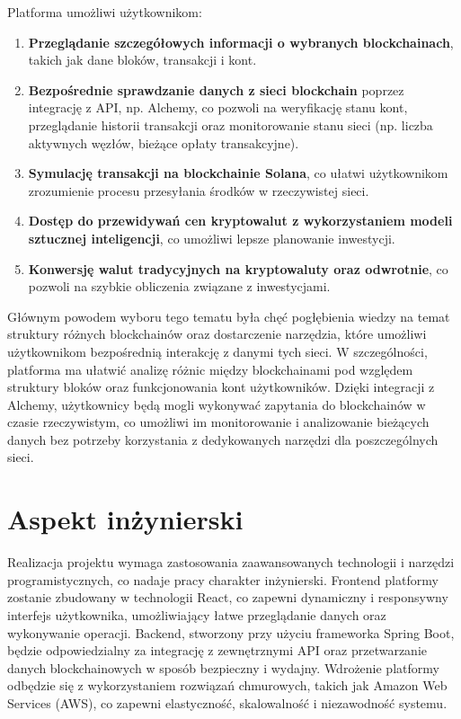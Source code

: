 Platforma umożliwi użytkownikom:

\begin{enumerate} \item \textbf{Przeglądanie szczegółowych informacji o wybranych blockchainach}, takich jak dane bloków, transakcji i kont. \item \textbf{Bezpośrednie sprawdzanie danych z sieci blockchain} poprzez integrację z API, np. Alchemy, co pozwoli na weryfikację stanu kont, przeglądanie historii transakcji oraz monitorowanie stanu sieci (np. liczba aktywnych węzłów, bieżące opłaty transakcyjne). \item \textbf{Symulację transakcji na blockchainie Solana}, co ułatwi użytkownikom zrozumienie procesu przesyłania środków w rzeczywistej sieci. \item \textbf{Dostęp do przewidywań cen kryptowalut z wykorzystaniem modeli sztucznej inteligencji}, co umożliwi lepsze planowanie inwestycji. \item \textbf{Konwersję walut tradycyjnych na kryptowaluty oraz odwrotnie}, co pozwoli na szybkie obliczenia związane z inwestycjami. \end{enumerate}

Głównym powodem wyboru tego tematu była chęć pogłębienia wiedzy na temat struktury różnych blockchainów oraz dostarczenie narzędzia, które umożliwi użytkownikom bezpośrednią interakcję z danymi tych sieci. W szczególności, platforma ma ułatwić analizę różnic między blockchainami pod względem struktury bloków oraz funkcjonowania kont użytkowników. Dzięki integracji z Alchemy, użytkownicy będą mogli wykonywać zapytania do blockchainów w czasie rzeczywistym, co umożliwi im monitorowanie i analizowanie bieżących danych bez potrzeby korzystania z dedykowanych narzędzi dla poszczególnych sieci.

\section{Aspekt inżynierski}

Realizacja projektu wymaga zastosowania zaawansowanych technologii i narzędzi programistycznych, co nadaje pracy charakter inżynierski. Frontend platformy zostanie zbudowany w technologii React, co zapewni dynamiczny i responsywny interfejs użytkownika, umożliwiający łatwe przeglądanie danych oraz wykonywanie operacji. Backend, stworzony przy użyciu frameworka Spring Boot, będzie odpowiedzialny za integrację z zewnętrznymi API oraz przetwarzanie danych blockchainowych w sposób bezpieczny i wydajny. Wdrożenie platformy odbędzie się z wykorzystaniem rozwiązań chmurowych, takich jak Amazon Web Services (AWS), co zapewni elastyczność, skalowalność i niezawodność systemu.

